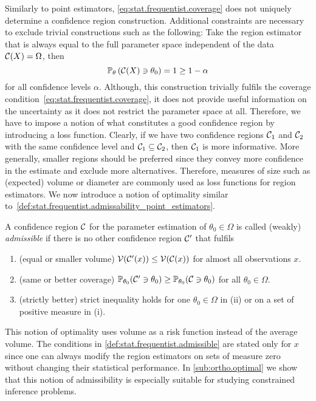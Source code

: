 Similarly to point estimators, \cref{eq:stat.frequentist.coverage} does not uniquely determine a confidence region construction.
Additional constraints are necessary to exclude trivial constructions such as the following:
Take the region estimator that is always equal to the full parameter space independent of the data $\mathcal{C}(X) = \Omega$, then
\[
  \mathbb{P}_\theta\left(  \mathcal{C}(X) \ni \theta_0  \right) = 1 \ge 1 - \alpha
\]
for all confidence levels $\alpha$.
Although, this construction trivially fulfils the coverage condition~\eqref{eq:stat.frequentist.coverage}, it does not provide useful information on the uncertainty as it does not restrict the parameter space at all.
Therefore, we have to impose a notion of what constitutes a good confidence region by introducing a loss function.
Clearly, if we have two confidence regions $\mathcal{C}_1$ and $\mathcal{C}_2$ with the same confidence level and $\CR_1 \truesubset \CR_2$, then $\mathcal{C}_1$ is more informative.
More generally, smaller regions should be preferred since they convey more confidence in the estimate and exclude more alternatives.
Therefore, measures of size such as (expected) volume or diameter are commonly used as loss functions for region estimators.
We now introduce a notion of optimality similar to~\cref{def:stat.frequentist.admissability_point_estimators}.
\begin{definition}{\cite[Def. 2.2]{Joshi_1969_Admissibility}}%
  \label{def:stat.frequentist.admissible}
  A confidence region $\mathcal{C}$ for the parameter estimation of $\theta_0 \in \Omega$ is called (weakly) \emph{admissible} if there is no other confidence region $\mathcal{C}'$ that fulfils
  \begin{enumerate}
    \item(equal or smaller volume) $\mathcal{V}(\mathcal{C}'(x)) \le \mathcal{V}(\mathcal{C}(x))$ for almost all observations $x$.
    \item(same or better coverage) $\mathbb{P}_{\theta_0}(\mathcal{C}' \owns \theta_0) \ge \mathbb{P}_{\theta_0}(\mathcal{C} \owns \theta_0)$ for all $\theta_0 \in \Omega$.
    \item(strictly better) strict inequality holds for one $\theta_0 \in \Omega$ in (ii) or on a set of positive measure in (i).
  \end{enumerate}
\end{definition}
This notion of optimality uses  volume as a risk function instead of the average volume.
The conditions in \cref{def:stat.frequentist.admissible} are stated only for  $x$ since one can always modify the region estimators on sets of measure zero without changing their statistical performance.
In \cref{sub:ortho.optimal} we show that this notion of admissibility is especially suitable for studying constrained inference problems.


